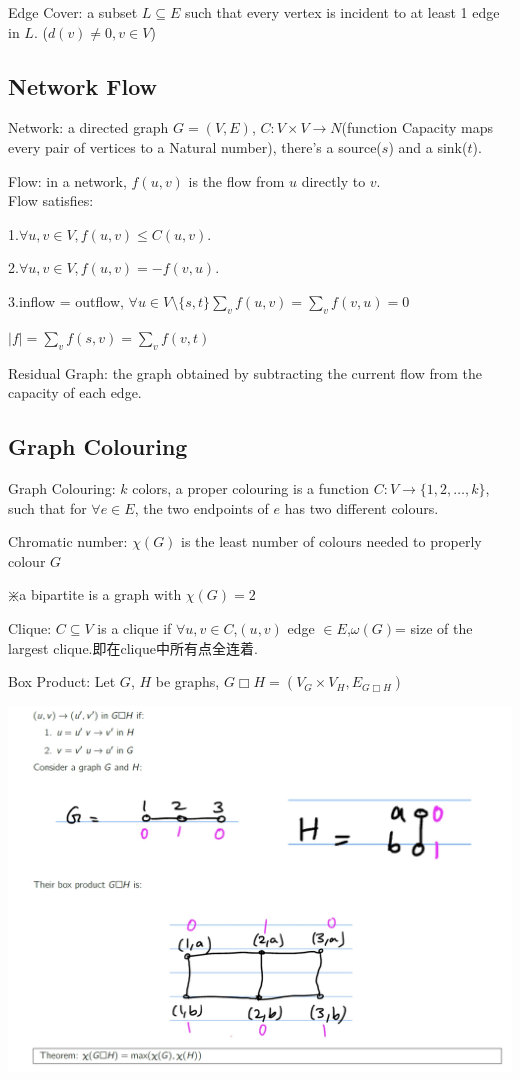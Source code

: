 \documentclass[12pt,a4paper]{ctexrep}
\begin{document}
Edge Cover: a subset $L\subseteq E$ such that every vertex is incident to at least 1 edge in $L$. ($d(v)\neq 0,v \in V$)
\subsection{Network Flow}
Network: a directed graph $G=(V,E)$, $C:V\times V \rightarrow N$(function Capacity maps every pair of vertices to a Natural number), there's a source($s$) and a sink($t$).

Flow: in a network, $f(u,v)$ is the flow from $u$ directly to $v$. \\
Flow satisfies: 

1.$\forall u,v \in V, f(u,v)\leq C(u,v)$. 

2.$\forall u,v \in V, f(u,v) = -f(v,u)$. 

3.inflow = outflow, $\forall u \in V\setminus \{s,t\} \sum_{v} f(u,v) = \sum_{v} f(v,u) = 0$

$|f| = \sum_{v} f(s,v) = \sum_{v} f(v,t)$

Residual Graph: the graph obtained by subtracting the current flow from the capacity of each edge.
\subsection{Graph Colouring}
Graph Colouring: $k$ colors, a proper colouring is a function $C: V\rightarrow \{1,2,\dots,k\}$, such that for $\forall e \in E$, the two endpoints of $e$ has two different colours.

Chromatic number: $\chi(G)$ is the least number of colours needed to properly colour $G$

$\divideontimes$a bipartite is a graph with $\chi(G)=2$

Clique: $C\subseteq V$ is a clique if $\forall u,v \in C$,$(u,v)$ edge $\in E$,$\omega(G)$= size of the largest clique.即在clique中所有点全连着.

Box Product: Let $G$, $H$ be graphs, $G\Box H =(V_{G} \times V_{H},E_{G \Box H})$

\begin{center}
\includegraphics[scale=0.3]{Box_Product.png}
\end{center}
\end{document}
